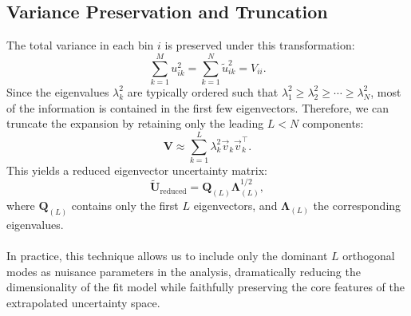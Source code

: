 \subsection*{Variance Preservation and Truncation}
The total variance in each bin $i$ is preserved under this transformation:
\begin{equation*}
\sum_{k=1}^{M} u_{ik}^2 = \sum_{k=1}^{N} \tilde{u}_{ik}^2 = V_{ii}.
\end{equation*}
Since the eigenvalues $\lambda_k^2$ are typically ordered such that $\lambda_1^2 \geq \lambda_2^2 \geq \cdots \geq \lambda_N^2$, most of the information is contained in the first few eigenvectors. Therefore, we can truncate the expansion by retaining only the leading $L < N$ components:
\begin{equation*}
\mathbf{V} \approx \sum_{k=1}^{L} \lambda_k^2 \vec{v}_k \vec{v}_k^\top.
\end{equation*}
This yields a reduced eigenvector uncertainty matrix:
\begin{equation*}
\tilde{\mathbf{U}}_{\text{reduced}} = \mathbf{Q}_{(L)} \boldsymbol{\Lambda}_{(L)}^{1/2},
\end{equation*}
where $\mathbf{Q}_{(L)}$ contains only the first $L$ eigenvectors, and $\boldsymbol{\Lambda}_{(L)}$ the corresponding eigenvalues.
\\
\\
In practice, this technique allows us to include only the dominant $L$ orthogonal modes as nuisance parameters in the analysis, dramatically reducing the dimensionality of the fit model while faithfully preserving the core features of the extrapolated uncertainty space.
